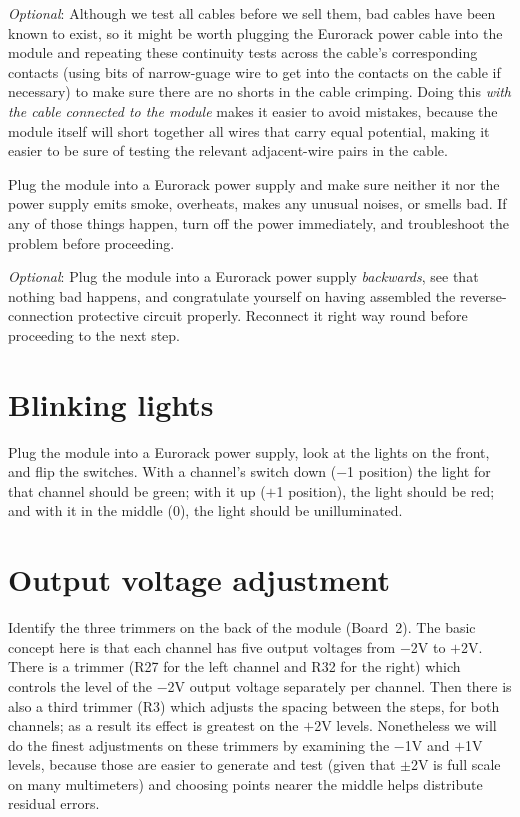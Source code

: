 \emph{Optional}:  Although we test all cables before we sell them, bad
cables have been known to exist, so it might be worth plugging the Eurorack
power cable into the module and repeating these continuity tests across the
cable's corresponding contacts (using bits of narrow-guage wire to get into
the contacts on the cable if necessary) to make sure there are no shorts in
the cable crimping.  Doing this \emph{with the cable connected to the
module} makes it easier to avoid mistakes, because the module itself will
short together all wires that carry equal potential, making it easier to be
sure of testing the relevant adjacent-wire pairs in the cable.

Plug the module into a Eurorack power supply and make sure
neither it nor the power supply emits smoke, overheats, makes any unusual
noises, or smells bad.  If any of those things happen, turn off the power
immediately, and troubleshoot the problem before proceeding.

\emph{Optional}: Plug the module into a Eurorack power supply
\emph{backwards}, see that nothing bad happens, and congratulate yourself on
having assembled the reverse-connection protective circuit properly. 
Reconnect it right way round before proceeding to the next step.

\section{Blinking lights}

Plug the module into a Eurorack power supply, look at the lights on the
front, and flip the switches.  With a channel's switch down ($-$1 position)
the light for that channel should be green; with it up ($+$1 position), the
light should be red; and with it in the middle (0), the light should be
unilluminated.

\section{Output voltage adjustment}

Identify the three trimmers on the back of the module (Board~2).  The basic
concept here is that each channel has five output voltages from $-$2V to
$+$2V.  There is a trimmer (R27 for the left channel and R32 for the right)
which controls the level of the $-$2V output voltage separately per channel. 
Then there is also a third trimmer (R3) which adjusts the spacing between
the steps, for both channels; as a result its effect is greatest on the
$+$2V levels.  Nonetheless we will do the finest adjustments on these
trimmers by examining the $-$1V and $+$1V levels, because those are easier
to generate and test (given that $\pm$2V is full scale on many multimeters)
and choosing points nearer the middle helps distribute residual errors.

